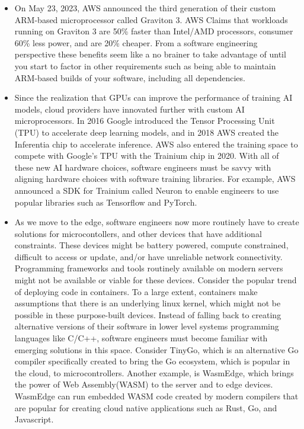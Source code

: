 \documentclass[conference]{IEEEconf}
\begin{document}
\begin{itemize}
	\item On May 23, 2023, AWS announced the third generation of their custom ARM-based microprocessor called Graviton 3.  AWS Claims that workloads running on Graviton 3 are 50\% faster than Intel/AMD processors, consumer 60\% less power, and are 20\% cheaper. From a software engineering perspective these benefits seem like a no brainer to take advantage of until you start to factor in other requirements such as being able to maintain ARM-based builds of your software, including all dependencies. 
		
	\item Since the realization that GPUs can improve the performance of training AI models, cloud providers have innovated further with custom AI microprocessors.  In 2016 Google introduced the Tensor Processing Unit (TPU) to accelerate deep learning models, and in 2018 AWS created the Inferentia chip to accelerate inference. AWS also entered the training space to compete with Google's TPU with the Trainium chip in 2020.  With all of these new AI hardware choices, software engineers must be savvy with aligning hardware choices with software training libraries. For example, AWS announced a SDK for Trainium called Neuron to enable engineers to use popular libraries such as Tensorflow and PyTorch.  
	
	\item As we move to the edge, software engineers now more routinely have to create solutions for microcontollers, and other devices that have additional constraints.  These devices might be battery powered, compute constrained, difficult to access or update, and/or have unreliable network connectivity. Programming frameworks and tools routinely available on modern servers might not be available or viable for these devices.  Consider the popular trend of deploying code in containers.  To a large extent, containers make assumptions that there is an underlying linux kernel, which might not be possible in these purpose-built devices. Instead of falling back to creating alternative versions of their software in lower level systems programming languages like C/C++, software engineers must become familiar with emerging solutions in this space.  Consider TinyGo\cite{TinyGo}, which is an alternative Go compiler specifically created to bring the Go ecosystem, which is popular in the cloud, to microcontrollers.  Another example, is WasmEdge\cite{WASMEdge}, which brings the power of Web Assembly(WASM) to the server and to edge devices.  WasmEdge can run embedded WASM code created by modern compilers that are popular for creating cloud native applications such as Rust, Go, and Javascript.       
	

\end{itemize}
\end{document}
